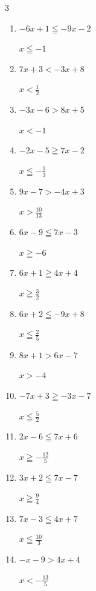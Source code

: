 \begin{multicols}{3}
\begin{enumerate}
  \item $-6x+1\leqq -9x-2$

        $\displaystyle x\leqq -1$

  \item $7x+3<-3x+8$

        $\displaystyle x<\frac{1}{2}$

\columnbreak %

  \item $-3x-6>8x+5$

        $\displaystyle x<-1$

  \item $-2x-5\geqq 7x-2$

        $\displaystyle x\leqq -\frac{1}{3}$

  \item $9x-7>-4x+3$

        $\displaystyle x>\frac{10}{13}$

  \item $6x-9\leqq 7x-3$

        $\displaystyle x\geqq -6$

  \item $6x+1\geqq 4x+4$

        $\displaystyle x\geqq \frac{3}{2}$

  \item $6x+2\leqq -9x+8$

        $\displaystyle x\leqq \frac{2}{5}$

  \item $8x+1>6x-7$

        $\displaystyle x>-4$

  \item $-7x+3\geqq -3x-7$

        $\displaystyle x\leqq \frac{5}{2}$

  \item $2x-6\leqq 7x+6$

        $\displaystyle x\geqq -\frac{12}{5}$

  \item $3x+2\leqq 7x-7$

        $\displaystyle x\geqq \frac{9}{4}$

  \item $7x-3\leqq 4x+7$

        $\displaystyle x\leqq \frac{10}{3}$

  \item $-x-9>4x+4$

        $\displaystyle x<-\frac{13}{5}$


\end{enumerate}
\end{multicols}
